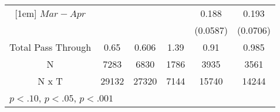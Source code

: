 {\begin{tabular}{c*{5}{c}}
[1em]
 $ Mar-Apr $        &                     &                     &                     &       0.188\sym{**} &       0.193\sym{**} \\
                    &                     &                     &                     &    (0.0587)         &    (0.0706)         \\
\hline
Total Pass Through & 0.65 & 0.606 & 1.39 & 0.91 & 0.985 \\
N & 7283 & 6830 & 1786 & 3935 & 3561 \\
N x T        &       29132         &       27320         &        7144         &       15740         &       14244         \\
\hline\hline
\multicolumn{6}{l}{\tiny \sym{*} \(p<.10\), \sym{**} \(p<.05\), \sym{***} \(p<.001\)}\\
\end{tabular}
}
